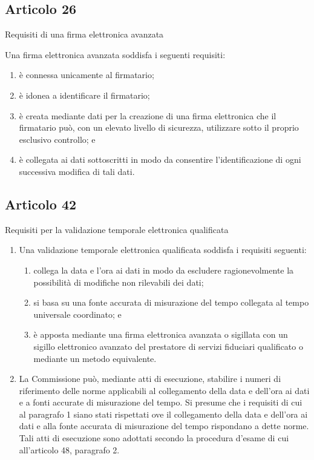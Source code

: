\subsection*{Articolo 26}\label{sec:articolo26reg9102014}
Requisiti di una firma elettronica avanzata\par 
Una firma elettronica avanzata soddisfa i seguenti requisiti:
\begin{enumerate}
	\item 	
	è connessa unicamente al firmatario;
	\item 	
	è idonea a identificare il firmatario;
	\item è creata mediante dati per la creazione di una firma elettronica che il firmatario può, con un elevato livello di sicurezza, utilizzare sotto il proprio esclusivo controllo; e
	\item è collegata ai dati sottoscritti in modo da consentire l’identificazione di ogni successiva modifica di tali dati.
\end{enumerate}
\subsection*{Articolo 42}\label{sec:articolo42reg9102014}
Requisiti per la validazione temporale elettronica qualificata
\begin{enumerate}
	\item Una validazione temporale elettronica qualificata soddisfa i requisiti seguenti:
	\begin{enumerate}
		\item collega la data e l’ora ai dati in modo da escludere ragionevolmente la possibilità di modifiche non rilevabili dei dati;
		\item si basa su una fonte accurata di misurazione del tempo collegata al tempo universale coordinato; e
		\item è apposta mediante una firma elettronica avanzata o sigillata con un sigillo elettronico avanzato del prestatore di servizi fiduciari qualificato o mediante un metodo equivalente.
	\end{enumerate}
\item La Commissione può, mediante atti di esecuzione, stabilire i numeri di riferimento delle norme applicabili al collegamento della data e dell’ora ai dati e a fonti accurate di misurazione del tempo. Si presume che i requisiti di cui al paragrafo 1 siano stati rispettati ove il collegamento della data e dell’ora ai dati e alla fonte accurata di misurazione del tempo rispondano a dette norme. Tali atti di esecuzione sono adottati secondo la procedura d’esame di cui all’articolo 48, paragrafo 2.
\end{enumerate}
